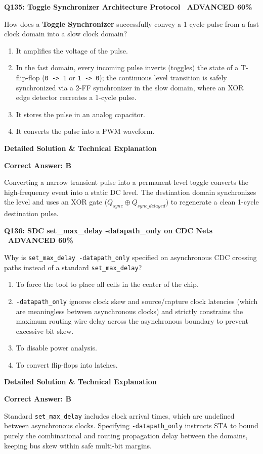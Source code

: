 \documentclass[11pt,a4paper]{article}
\newcommand{\badgeadv}{{\color{white}\colorbox{advred}{\bfseries\sffamily\tiny\ ADVANCED 60\%\ }}}
\newenvironment{qbox}[2]{%
  \begin{mdframed}[style=qstyle]%
  {\bfseries\sffamily\color{primaryblue}#1 \hfill #2}\par\vspace{2pt}%
}{%
  \end{mdframed}%
}
\newenvironment{ansbox}{%
  \begin{mdframed}[style=ansstyle]%
  {\bfseries\sffamily\color{ansgreen}\small Detailed Solution \& Technical Explanation}\par\vspace{2pt}\small%
}{%
  \end{mdframed}%
}
\begin{document}
\begin{qbox}{Q135: Toggle Synchronizer Architecture Protocol}{\badgeadv}
How does a \textbf{Toggle Synchronizer} successfully convey a 1-cycle pulse from a fast clock domain into a slow clock domain?
\begin{enumerate}[label=\textbf{\Alph*.}]
  \item It amplifies the voltage of the pulse.
  \item In the fast domain, every incoming pulse inverts (toggles) the state of a T-flip-flop (\texttt{0 -> 1} or \texttt{1 -> 0}); the continuous level transition is safely synchronized via a 2-FF synchronizer in the slow domain, where an XOR edge detector recreates a 1-cycle pulse.
  \item It stores the pulse in an analog capacitor.
  \item It converts the pulse into a PWM waveform.
\end{enumerate}
\end{qbox}
\begin{ansbox}
\textbf{Correct Answer: B}

Converting a narrow transient pulse into a permanent level toggle converts the high-frequency event into a static DC level. The destination domain synchronizes the level and uses an XOR gate ($Q_{sync} \oplus Q_{sync\_delayed}$) to regenerate a clean 1-cycle destination pulse.
\end{ansbox}

\begin{qbox}{Q136: SDC set\_max\_delay -datapath\_only on CDC Nets}{\badgeadv}
Why is \texttt{set\_max\_delay -datapath\_only} specified on asynchronous CDC crossing paths instead of a standard \texttt{set\_max\_delay}?
\begin{enumerate}[label=\textbf{\Alph*.}]
  \item To force the tool to place all cells in the center of the chip.
  \item \texttt{-datapath\_only} ignores clock skew and source/capture clock latencies (which are meaningless between asynchronous clocks) and strictly constrains the maximum routing wire delay across the asynchronous boundary to prevent excessive bit skew.
  \item To disable power analysis.
  \item To convert flip-flops into latches.
\end{enumerate}
\end{qbox}
\begin{ansbox}
\textbf{Correct Answer: B}

Standard \texttt{set\_max\_delay} includes clock arrival times, which are undefined between asynchronous clocks. Specifying \texttt{-datapath\_only} instructs STA to bound purely the combinational and routing propagation delay between the domains, keeping bus skew within safe multi-bit margins.
\end{ansbox}
\end{document}
